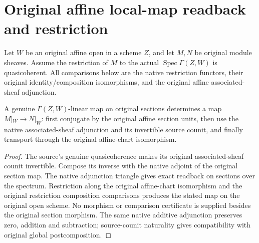 \section{Original affine local-map readback and restriction}

Let $W$ be an original affine open in a scheme $Z$, and let $M,N$ be
original module sheaves. Assume the restriction of $M$ to the actual
$\operatorname{Spec}\Gamma(Z,W)$ is quasicoherent. All comparisons below
are the native restriction functors, their original identity/composition
isomorphisms, and the original affine associated-sheaf adjunction.

\begin{definition}
\label{def:di-canonical-affine-local-map}
\leanok
{}
A genuine $\Gamma(Z,W)$-linear map on original sections determines a map
$M|_W\to N|_W$: first conjugate by the original affine section units,
then use the native associated-sheaf adjunction and its invertible source
counit, and finally transport through the original affine-chart isomorphism.
\end{definition}
\begin{proof}
The source's genuine quasicoherence makes its original associated-sheaf
counit invertible. Compose its inverse with the native adjoint of the
original section map. The native adjunction triangle gives exact readback
on sections over the spectrum. Restriction along the original affine-chart
isomorphism and the original restriction composition comparisons produces
the stated map on the original open scheme. No morphism or comparison
certificate is supplied besides the original section morphism. The same
native additive adjunction preserves zero, addition and subtraction;
source-counit naturality gives compatibility with original global
postcomposition.
\end{proof}


